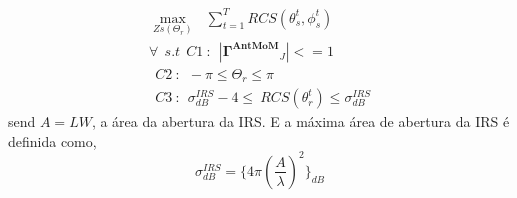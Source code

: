 \documentclass[
	12pt,				%
	openright,			%
	oneside,			%
	a4papey79r,			%
	english,			%
	brazil				%
	]{abntex2}
\begin{document}
\begin{equation}
  \begin{aligned}
          \max_{Zs(\Theta_r)} \ \ \ \sum_{t=1}^{T} RCS(\theta_s^t,\phi_s^t) \\
     \forall \ \ s.t \ \ C1 \ : \ \ |  \mathbf{\Gamma^{AntMoM}}_J| <=1 \\
\ \ C2 \ : \ \   -\pi\leq\Theta_r \leq \pi  \\
\ \ C3 \ : \ \     \sigma^{IRS}_{dB}-4\leq  \
RCS(\theta_r^t) \leq   \sigma^{IRS}_{dB}
  \end{aligned}
 
\end{equation}
send $A=LW$, a área da abertura da IRS. E a máxima área de abertura da IRS é definida como, 
\begin{equation}
    \sigma^{IRS}_{dB}=\{4\pi{(\frac{A}{\lambda})}^2\}_{dB}
\end{equation}
\end{document}
